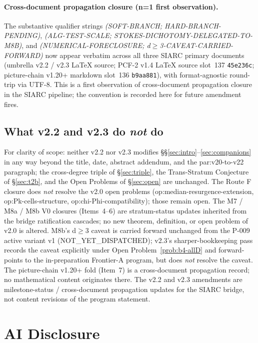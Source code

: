 \documentclass[11pt,a4paper]{article}
\theoremstyle{definition}
\theoremstyle{remark}
\begin{document}
\paragraph{Cross-document propagation closure (n=1 first observation).}
The substantive qualifier strings \emph{(SOFT-BRANCH; HARD-BRANCH-PENDING)},
\emph{(ALG-TEST-SCALE; STOKES-DICHOTOMY-DELEGATED-TO-M8B)}, and
\emph{(NUMERICAL-FORECLOSURE; d$\geq$3-CAVEAT-CARRIED-FORWARD)} now
appear verbatim across all three SIARC primary documents (umbrella
v2.2 / v2.3 \LaTeX{} source; PCF-2 v1.4 \LaTeX{} source slot~137
\texttt{45e236c}; picture-chain v1.20+ markdown slot~136
\texttt{b9aa881}), with format-agnostic round-trip via UTF-8. This
is a first observation of cross-document propagation closure in the
SIARC pipeline; the convention is recorded here for future
amendment fires.

\subsection{What v2.2 and v2.3 do \emph{not} do}
\label{sec:closure-cascade-out-of-scope}

For clarity of scope: neither v2.2 nor v2.3 modifies
\S\S\ref{sec:intro}--\ref{sec:companions} in any way beyond the
title, date, abstract addendum, and the \textsf{par:v20-to-v22}
paragraph; the cross-degree triple of \S\ref{sec:triple}, the
Trans-Stratum Conjecture of \S\ref{sec:t2b}, and the Open Problems
of \S\ref{sec:open} are unchanged. The Route F closure does
\emph{not} resolve the v2.0 open problems
(\textsf{op:median-resurgence-extension}, \textsf{op:Pk-cells-structure},
\textsf{op:chi-Phi-compatibility}); those remain open. The M7 /
M8a / M8b V0 closures (Items~4--6) are stratum-status updates
inherited from the bridge ratification cascades; no new theorem,
definition, or open problem of v2.0 is altered. M8b's d$\geq$3
caveat is carried forward unchanged from the P-009 active variant
v1 (\textsf{NOT\_YET\_DISPATCHED}); v2.3's sharper-bookkeeping pass
records the caveat explicitly under Open
Problem~\ref{prob:b4-allD} and forward-points to the
in-preparation Frontier-A program, but does \emph{not} resolve the
caveat. The picture-chain v1.20+ fold (Item~7) is a cross-document
propagation record; no mathematical content originates there. The
v2.2 and v2.3 amendments are milestone-status / cross-document
propagation updates for the SIARC bridge, not content revisions of
the program statement.

\section{AI Disclosure}
\label{sec:ai}
\end{document}
